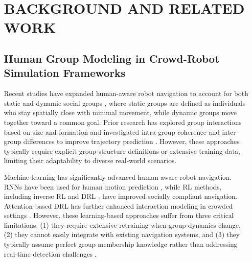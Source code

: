 \section{BACKGROUND AND RELATED WORK}

\subsection{Human Group Modeling in Crowd-Robot Simulation Frameworks}

Recent studies have expanded human-aware robot navigation to account for both static and dynamic social groups \cite{group-aware}, where static groups are defined as individuals who stay spatially close with minimal movement, while dynamic groups move together toward a common goal. Prior research has explored group interactions based on size and formation \cite{kato2015may} and investigated intra-group coherence \cite{luber2013multi,taylor2020robot} and inter-group differences \cite{shao2014scene} to improve trajectory prediction \cite{unhelkar2015human}. However, these approaches typically require explicit group structure definitions or extensive training data, limiting their adaptability to diverse real-world scenarios.

Machine learning has significantly advanced human-aware robot navigation. RNNs \cite{alahi2016social} have been used for human motion prediction \cite{bisagno2018group}, while RL methods, including inverse RL \cite{kretzschmar2016socially} and DRL \cite{chen2019relational}, have improved socially compliant navigation. Attention-based DRL has further enhanced interaction modeling in crowded settings \cite{chen2019crowd,chen2017decentralized}. However, these learning-based approaches suffer from three critical limitations: (1) they require extensive retraining when group dynamics change, (2) they cannot easily integrate with existing navigation systems, and (3) they typically assume perfect group membership knowledge rather than addressing real-time detection challenges \cite{gao2022evaluation}.


